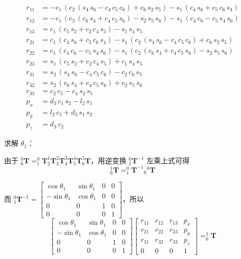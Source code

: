 \documentclass{homework}
\begin{document}
\begin{sol}
\begin{align*} 
  r_{11} &= -c_{1}\,\left(c_{2}\,\left(s_{4}\,s_{6}-c_{4}\,c_{5}\,c_{6}\right)+c_{6}\,s_{2}\,s_{5}\right)-s_{1}\,\left(c_{4}\,s_{6}+c_{5}\,c_{6}\,s_{4}\right) \\ 
  r_{12} &= -c_{1}\,\left(c_{2}\,\left(c_{6}\,s_{4}+c_{4}\,c_{5}\,s_{6}\right)-s_{2}\,s_{5}\,s_{6}\right)-s_{1}\,\left(c_{4}\,c_{6}-c_{5}\,s_{4}\,s_{6}\right) \\ 
  r_{13} &= c_{1}\,\left(c_{5}\,s_{2}+c_{2}\,c_{4}\,s_{5}\right)-s_{1}\,s_{4}\,s_{5} \\ 
  r_{21} &= c_{1}\,\left(c_{4}\,s_{6}+c_{5}\,c_{6}\,s_{4}\right)-s_{1}\,\left(c_{2}\,\left(s_{4}\,s_{6}-c_{4}\,c_{5}\,c_{6}\right)+c_{6}\,s_{2}\,s_{5}\right) \\ 
  r_{22} &= c_{1}\,\left(c_{4}\,c_{6}-c_{5}\,s_{4}\,s_{6}\right)-s_{1}\,\left(c_{2}\,\left(c_{6}\,s_{4}+c_{4}\,c_{5}\,s_{6}\right)-s_{2}\,s_{5}\,s_{6}\right) \\ 
  r_{23} &= s_{1}\,\left(c_{5}\,s_{2}+c_{2}\,c_{4}\,s_{5}\right)+c_{1}\,s_{4}\,s_{5} \\ 
  r_{31} &= s_{2}\,\left(s_{4}\,s_{6}-c_{4}\,c_{5}\,c_{6}\right)-c_{2}\,c_{6}\,s_{5} \\ 
  r_{32} &= s_{2}\,\left(c_{6}\,s_{4}+c_{4}\,c_{5}\,s_{6}\right)+c_{2}\,s_{5}\,s_{6} \\ 
  r_{33} &= c_{2}\,c_{5}-c_{4}\,s_{2}\,s_{5} \\ 
  p_x &= d_{3}\,c_{1}\,s_{2}-l_{2}\,s_{1} \\ 
  p_y &= l_{2}\,c_{1}+d_{3}\,s_{1}\,s_{2} \\ 
  p_z &= d_{3}\,c_{2}
\end{align*}

求解 $ \theta_1 $：

由于 $ _6^0\mathbf{T} = _1^0\mathbf{T} _2^1\mathbf{T} _3^2\mathbf{T} _4^3\mathbf{T} _5^4\mathbf{T} _6^5\mathbf{T} $，用逆变换 $ _1^0\mathbf{T}^{-1} $ 左乘上式可得
\[
  _6^1\mathbf{T} = _1^0\mathbf{T}^{-1} {_6}^0\mathbf{T}
\]

而 $ _1^0\mathbf{T}^{-1} =
  \begin{bmatrix}
    \cos\theta_1 & \sin\theta_1 & 0 & 0 \\
    -\sin\theta_1 & \cos\theta_1 & 0 & 0 \\
    0 & 0 & 1 & 0 \\
    0 & 0 & 0 & 1
  \end{bmatrix}
$，所以
\[
  \begin{bmatrix}
    \cos\theta_1 & \sin\theta_1 & 0 & 0 \\
    -\sin\theta_1 & \cos\theta_1 & 0 & 0 \\
    0 & 0 & 1 & 0 \\
    0 & 0 & 0 & 1
  \end{bmatrix}
  \begin{bmatrix} 
    r_{11} & r_{12} & r_{13} & p_x \\ 
    r_{21} & r_{22} & r_{23} & p_y \\ 
    r_{31} & r_{32} & r_{33} & p_z \\ 
    0 & 0 & 0 & 1
  \end{bmatrix} = _6^1\mathbf{T}
\]


\end{sol}
\end{document}
